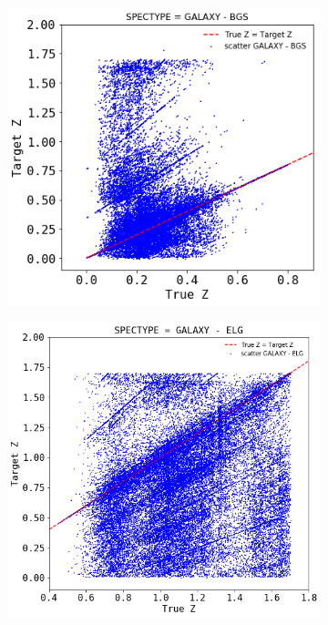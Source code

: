 \begin{figure}[!htbp]
	\centering
	\begin{subfigure}[b]{0.5\textwidth}
		\includegraphics[width=1\linewidth]{TeX_files/Imagenes/BGS-z-truez}
		\caption{}
		\label{fig:BGS-z-truez} 
	\end{subfigure}    
	\begin{subfigure}[b]{0.5\textwidth}
		\includegraphics[width=1\linewidth]{TeX_files/Imagenes/ELG-z-truez}

\end{subfigure}
\end{figure}

